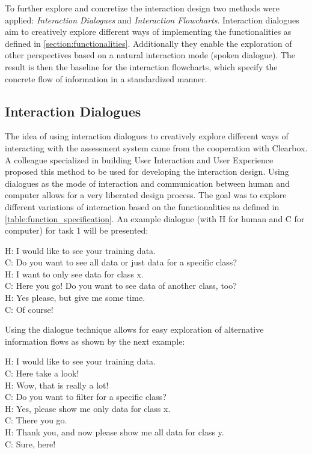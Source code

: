 \documentclass[11pt,a4paper,english]{scrreprt}
\begin{document}
To further explore and concretize the interaction design two methods were applied: \textit{Interaction Dialogues} and \textit{Interaction Flowcharts}. Interaction dialogues aim to creatively explore different ways of implementing the functionalities as defined in \autoref{section:functionalities}. Additionally they enable the exploration of other perspectives based on a natural interaction mode (spoken dialogue). The result is then the baseline for the interaction flowcharts, which specify the concrete flow of information in a standardized manner.

\subsection{Interaction Dialogues}\label{subsection:interaction_dialogues}
The idea of using interaction dialogues to creatively explore different ways of interacting with the assessment system came from the cooperation with Clearbox. A colleague specialized in building User Interaction and User Experience proposed this method to be used for developing the interaction design. Using dialogues as the mode of interaction and communication between human and computer allows for a very liberated design process. The goal was to explore different variations of interaction based on the functionalities as defined in \autoref{table:function_specification}. An example dialogue (with H for human and C for computer) for task 1 will be presented:
\begin{displayquote}
    H: I would like to see your training data.\\
    C: Do you want to see all data or just data for a specific class?\\
    H: I want to only see data for class x.\\
    C: Here you go! Do you want to see data of another class, too?\\
    H: Yes please, but give me some time.\\
    C: Of course!
\end{displayquote}

Using the dialogue technique allows for easy exploration of alternative information flows as shown by the next example:
\begin{displayquote}
    H: I would like to see your training data.\\
    C: Here take a look!\\
    H: Wow, that is really a lot!\\
    C: Do you want to filter for a specific class?\\
    H: Yes, please show me only data for class x.\\
    C: There you go.\\
    H: Thank you, and now please show me all data for class y.\\
    C: Sure, here!
\end{displayquote}
\end{document}
